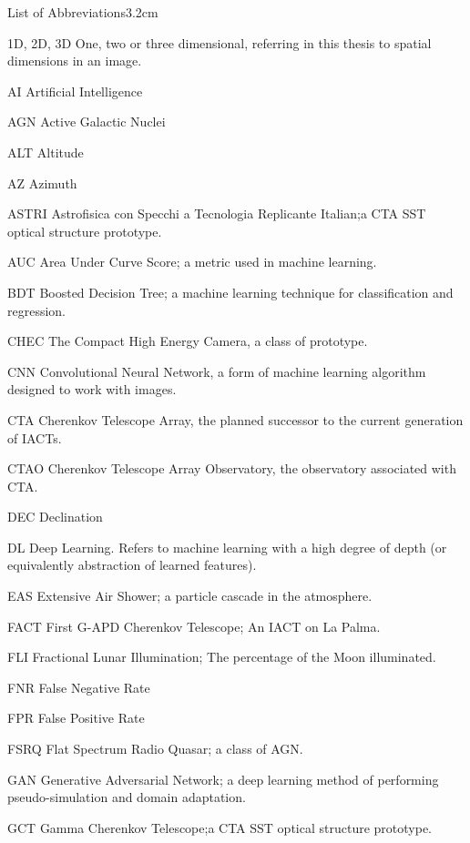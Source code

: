 \begin{mclistof}{List of Abbreviations}{3.2cm}

\item[1D, 2D, 3D] One, two or three dimensional, referring in this thesis to spatial dimensions in an image.
\item[AI] Artificial Intelligence
\item[AGN] Active Galactic Nuclei
\item[ALT] Altitude
\item[AZ] Azimuth
\item[ASTRI] Astrofisica con Specchi a Tecnologia Replicante Italian;a CTA SST optical structure prototype.
\item[AUC] Area Under Curve Score; a metric used in machine learning.
\item[BDT] Boosted Decision Tree; a machine learning technique for classification and regression.
\item[CHEC] The Compact High Energy Camera, a class of prototype.
\item[CNN] Convolutional Neural Network, a form of machine learning algorithm designed to work with images.
\item[CTA] Cherenkov Telescope Array, the planned successor to the current generation of IACTs.
\item[CTAO] Cherenkov Telescope Array Observatory, the observatory associated with CTA.
\item[DEC] Declination
\item[DL] Deep Learning. Refers to machine learning with a high degree of depth (or equivalently abstraction of learned features).
\item[EAS] Extensive Air Shower; a particle cascade in the atmosphere.
\item[FACT] First G-APD Cherenkov Telescope; An IACT on La Palma.
\item[FLI] Fractional Lunar Illumination; The percentage of the Moon illuminated.
\item[FNR] False Negative Rate
\item[FPR] False Positive Rate
\item[FSRQ] Flat Spectrum Radio Quasar; a class of AGN.
\item[GAN] Generative Adversarial Network; a deep learning method of performing pseudo-simulation and domain adaptation.
\item[GCT] Gamma Cherenkov Telescope;a CTA SST optical structure prototype.

\end{mclistof}
